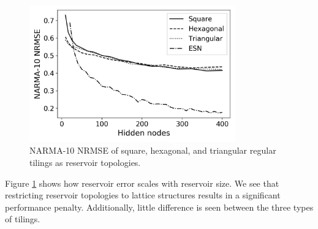 \begin{figure}[t]
  \centering
  \includegraphics[width=3.5in]{figures/regular-tilings-performance.png}
  \caption{
    NARMA-10 NRMSE of square, hexagonal, and triangular regular tilings as
reservoir topologies.
  }
  \label{fig:rt-performance}
\end{figure}

Figure \ref{fig:rt-performance} shows how reservoir error scales with reservoir
size. We see that restricting reservoir topologies to lattice structures results
in a significant performance penalty. Additionally, little difference is seen
between the three types of tilings.

